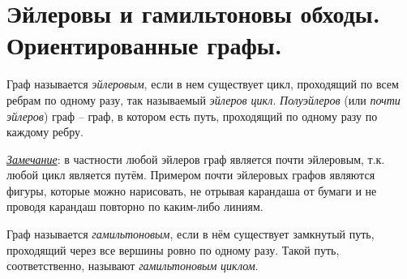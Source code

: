 
\section{Эйлеровы и гамильтоновы обходы. Ориентированные графы.}

\begin{dfn}
    Граф называется \textit{эйлеровым}, если в нем существует цикл, проходящий по всем ребрам по одному разу, так называемый \textit{эйлеров цикл}. \textit{Полуэйлеров} (или \textit{почти эйлеров}) граф -- граф, в котором есть путь, проходящий по одному разу по каждому ребру.
\end{dfn}

\textit{\underline{Замечание}}: в частности любой эйлеров граф является почти эйлеровым, т.к. любой цикл является путём. Примером почти эйлеровых графов являются фигуры, которые можно нарисовать, не отрывая карандаша от бумаги и не проводя карандаш повторно по каким-либо линиям. 


\begin{dfn}
    Граф называется \textit{гамильтоновым}, если в нём существует замкнутый путь, проходящий через все вершины ровно по одному разу. Такой путь, соответственно, называют \textit{гамильтоновым} \textit{циклом}.
\end{dfn}


